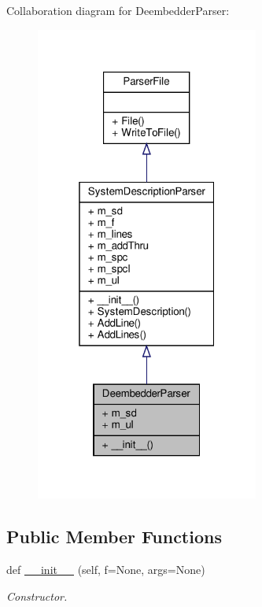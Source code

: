 Collaboration diagram for Deembedder\+Parser\+:\nopagebreak
\begin{figure}[H]
\begin{center}
\leavevmode
\includegraphics[width=208pt]{classSignalIntegrity_1_1Parsers_1_1DeembedderParser_1_1DeembedderParser__coll__graph}
\end{center}
\end{figure}
\subsection*{Public Member Functions}
\begin{DoxyCompactItemize}
\item 
def \hyperlink{classSignalIntegrity_1_1Parsers_1_1DeembedderParser_1_1DeembedderParser_af9856388f7022892c3159ad55872a27e}{\+\_\+\+\_\+init\+\_\+\+\_\+} (self, f=None, args=None)
\begin{DoxyCompactList}\small\item\em Constructor. \end{DoxyCompactList}\end{DoxyCompactItemize}



